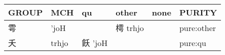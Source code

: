 \documentclass[14pt,a4paper]{scrartcl}
\begin{document}
\begin{longtable}[c]{@{}llllll@{}}
\toprule
\begin{minipage}[b]{0.14\columnwidth}\raggedright\strut
GROUP
\strut\end{minipage} &
\begin{minipage}[b]{0.14\columnwidth}\raggedright\strut
MCH
\strut\end{minipage} &
\begin{minipage}[b]{0.14\columnwidth}\raggedright\strut
qu
\strut\end{minipage} &
\begin{minipage}[b]{0.14\columnwidth}\raggedright\strut
other
\strut\end{minipage} &
\begin{minipage}[b]{0.14\columnwidth}\raggedright\strut
none
\strut\end{minipage} &
\begin{minipage}[b]{0.14\columnwidth}\raggedright\strut
PURITY
\strut\end{minipage}\tabularnewline
\midrule
\endhead
\begin{minipage}[t]{0.14\columnwidth}\raggedright\strut
雩
\strut\end{minipage} &
\begin{minipage}[t]{0.14\columnwidth}\raggedright\strut
'joH
\strut\end{minipage} &
\begin{minipage}[t]{0.14\columnwidth}\raggedright\strut
\strut\end{minipage} &
\begin{minipage}[t]{0.14\columnwidth}\raggedright\strut
樗 trhjo
\strut\end{minipage} &
\begin{minipage}[t]{0.14\columnwidth}\raggedright\strut
\strut\end{minipage} &
\begin{minipage}[t]{0.14\columnwidth}\raggedright\strut
pure:other
\strut\end{minipage}\tabularnewline
\begin{minipage}[t]{0.14\columnwidth}\raggedright\strut
夭
\strut\end{minipage} &
\begin{minipage}[t]{0.14\columnwidth}\raggedright\strut
trhjo
\strut\end{minipage} &
\begin{minipage}[t]{0.14\columnwidth}\raggedright\strut
飫 'joH
\strut\end{minipage} &
\begin{minipage}[t]{0.14\columnwidth}\raggedright\strut
\strut\end{minipage} &
\begin{minipage}[t]{0.14\columnwidth}\raggedright\strut
\strut\end{minipage} &
\begin{minipage}[t]{0.14\columnwidth}\raggedright\strut
pure:qu
\strut\end{minipage}\tabularnewline
\bottomrule
\end{longtable}
\end{document}
